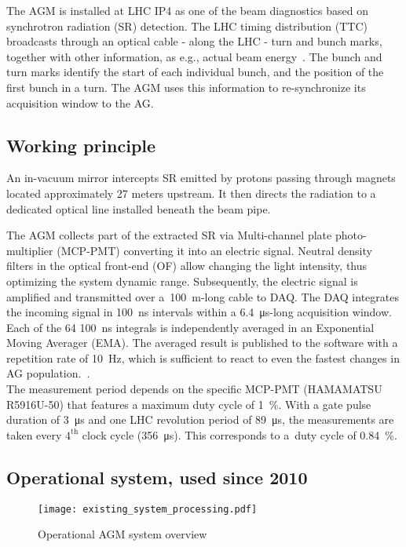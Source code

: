 %
The AGM is installed at LHC IP4 as one of the beam diagnostics based on synchrotron radiation (SR) detection. %
%
The LHC timing distribution (TTC) broadcasts through an optical cable - along the LHC - turn and bunch marks, together with other information, as e.g., actual beam energy~\cite{ttc_distribution}.
%
The bunch and turn marks identify the start of each individual bunch, and the position of the first bunch in a turn.   
%
The AGM uses this information to re-synchronize its acquisition window to the AG.
%
\subsection{Working principle}
%
An in-vacuum mirror intercepts  SR  emitted by protons passing through magnets located approximately 27 meters upstream. It then directs the radiation to a dedicated optical line installed beneath the beam pipe.

%
The AGM collects part of the extracted SR via Multi-channel plate photo-multiplier (MCP-PMT) converting it into an electric signal.
%
Neutral density filters in the optical front-end (OF) allow  changing the light intensity, thus optimizing the system dynamic range.
% 
Subsequently, the electric signal is amplified and transmitted over a~\SI{100}{m}-long cable to DAQ.
%
The DAQ integrates the incoming signal in \SI{100}{\nano\second} intervals within a \SI{6.4}{\micro\second}-long acquisition window.
%
Each of the 64 \SI{100}{\nano\second} integrals is independently averaged in an Exponential Moving Averager (EMA).
%
The averaged result is published to the software with a repetition rate of \SI{10}{Hz}, which is sufficient to react to even the fastest changes in AG population.~\cite{high_sensitivity_measurement}.
%
\\
The measurement period depends on the specific MCP-PMT (HAMAMATSU R5916U-50) that features a maximum duty cycle of \SI{1}{\%}. 
%
%
%
With a gate pulse duration of \SI{3}{\micro\second} and one LHC revolution period of \SI{89}{\micro\second}, the measurements are taken every $4^{\text{th}}$ clock cycle (\SI{356}{\micro\second}).
%
This corresponds to a~duty cycle of \SI{0.84}{\%}.
\\
%

\subsection{Operational system, used since 2010}
\begin{figure}[!tbh]
    \centering
    \texttt{[image: existing\_system\_processing.pdf]}
    \caption{Operational AGM system overview}
    \label{fig:current_system_processing}
\end{figure}

